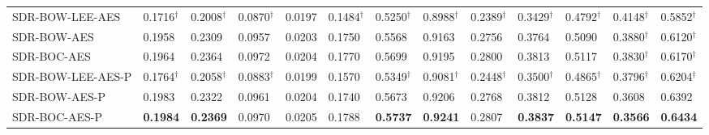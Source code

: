 \begin{tabular}{l|p{21pt}|p{19pt}p{19pt}p{21pt}|p{19pt}p{19pt}p{21pt}|p{19pt}p{19pt}p{21pt}|p{21pt}|p{19pt}}
SDR-BOW-LEE-AES&0.1716$^\dagger$&0.2008$^\dagger$&0.0870$^\dagger$&0.0197&0.1484$^\dagger$&0.5250$^\dagger$&0.8988$^\dagger$&0.2389$^\dagger$&0.3429$^\dagger$&0.4792$^\dagger$&0.4148$^\dagger$&0.5852$^\dagger$\\
SDR-BOW-AES&0.1958&0.2309&0.0957&0.0203&0.1750&0.5568&0.9163&0.2756&0.3764&0.5090&0.3880$^\dagger$&0.6120$^\dagger$\\
SDR-BOC-AES&0.1964&0.2364&0.0972&0.0204&0.1770&0.5699&0.9195&0.2800&0.3813&0.5117&0.3830$^\dagger$&0.6170$^\dagger$\\\midrule

SDR-BOW-LEE-AES-P&0.1764$^\dagger$&0.2058$^\dagger$&0.0883$^\dagger$&0.0199&0.1570&0.5349$^\dagger$&0.9081$^\dagger$&0.2448$^\dagger$&0.3500$^\dagger$&0.4865$^\dagger$&0.3796$^\dagger$&0.6204$^\dagger$\\
SDR-BOW-AES-P&0.1983&0.2322&0.0961&0.0204&0.1740&0.5673&0.9206&0.2768&0.3812&0.5128&0.3608&0.6392\\
SDR-BOC-AES-P&\textbf{0.1984}&\textbf{0.2369}&0.0970&0.0205&0.1788&\textbf{0.5737}&\textbf{0.9241}&0.2807&\textbf{0.3837}&\textbf{0.5147}&\textbf{0.3566}&\textbf{0.6434}\\

\bottomrule
\end{tabular}



